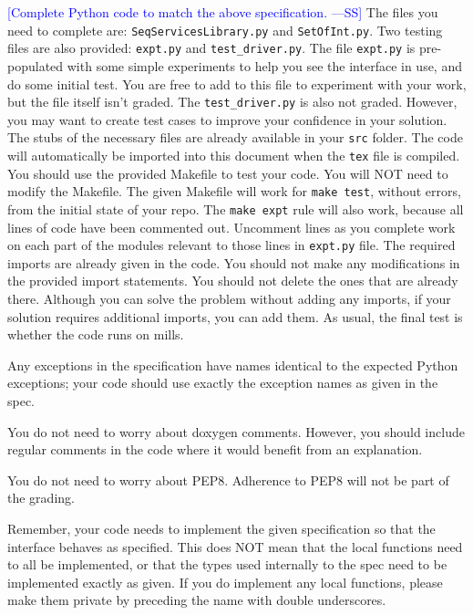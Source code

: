 \documentclass[12pt,fleqn]{examtst}
\newcommand{\authornote}[3]{\textcolor{#1}{[#3 ---#2]}}
\newcommand{\authornote}[3]{}
\newcommand{\wss}[1]{\authornote{blue}{SS}{#1}}
\begin{document}
\noindent
\begin{minipage}{\textwidth}
 \label{Q_PythonCode}

\wss{Complete Python code to match the above specification.}  The files you need
to complete are: \texttt{SeqServicesLibrary.py} and \texttt{SetOfInt.py}.  Two
testing files are also provided: \texttt{expt.py} and \texttt{test\_driver.py}.
The file \texttt{expt.py} is pre-populated with some simple experiments to help
you see the interface in use, and do some initial test.  You are free to add to
this file to experiment with your work, but the file itself isn't graded.  The
\texttt{test\_driver.py} is also not graded.  However, you may want to create
test cases to improve your confidence in your solution.  The stubs of the
necessary files are already available in your \texttt{src} folder.  The code
will automatically be imported into this document when the \texttt{tex} file is
compiled.  You should use the provided Makefile to test your code.  You will NOT
need to modify the Makefile.  The given Makefile will work for \texttt{make
  test}, without errors, from the initial state of your repo.  The \texttt{make
  expt} rule will also work, because all lines of code have been commented out.
Uncomment lines as you complete work on each part of the modules relevant to
those lines in \texttt{expt.py} file.  The required imports are already given in
the code.  You should not make any modifications in the provided import
statements.  You should not delete the ones that are already there.  Although
you can solve the problem without adding any imports, if your solution requires
additional imports, you can add them.  As usual, the final test is whether the
code runs on mills.

Any exceptions in the specification have names identical to the expected Python
exceptions; your code should use exactly the exception names as given in the
spec.

You do not need to worry about doxygen comments.  However, you should include
regular comments in the code where it would benefit from an explanation.

You do not need to worry about PEP8.  Adherence to PEP8 will not be part of the
grading.

Remember, your code needs to implement the given specification so that the
interface behaves as specified.  This does NOT mean that the local functions
need to all be implemented, or that the types used internally to the spec need
to be implemented exactly as given.  If you do implement any local functions,
please make them private by preceding the name with double underscores.\\

\end{minipage}
\end{document}
